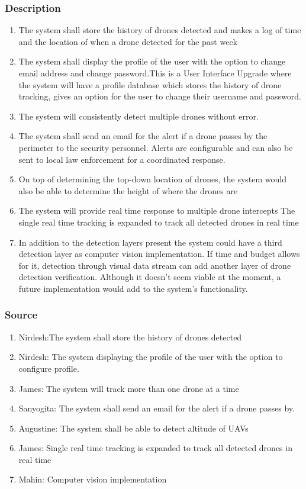 \subsubsection{Description}
\begin{enumerate}
  \item The system shall store the history of drones detected and makes a log of time and the location of when a drone detected for the past week
  \item The system shall display the profile of the user with the option to change email address and change password.This is a User Interface Upgrade where the system will have a profile database which stores the history of drone tracking, gives an option for the user to change their username and password.
  \item The system will consistently detect multiple drones without error.
  \item The system shall send an email for the alert if a drone passes by the perimeter to the security personnel. Alerts are configurable and can also be sent to local law enforcement for a coordinated response.
  \item On top of determining the top-down location of drones, the system would also be able to determine the height of where the drones are
  \item The system will provide real time response to multiple drone intercepts The single real time tracking is expanded to track all detected drones in real time
  \item In addition to the detection layers present the system could have a third detection layer as computer vision implementation. If time and budget allows for it, detection through visual data stream can add another layer of drone detection verification. Although it doesn't seem viable at the moment, a future implementation would add to the system's functionality.

\end{enumerate}

\subsubsection{Source}
\begin{enumerate}
\item Nirdesh:The system shall store the history of drones detected
\item Nirdesh: The system displaying the profile of the user with the option to configure profile. 
\item James: The system will track more than one drone at a time
\item Sanyogita: The system shall send an email for the alert if a drone passes by.
\item Augustine: The system shall be able to detect altitude of UAVs
\item James: Single real time tracking is expanded to track all detected drones in real time

\item Mahin: Computer vision implementation
\end{enumerate}
